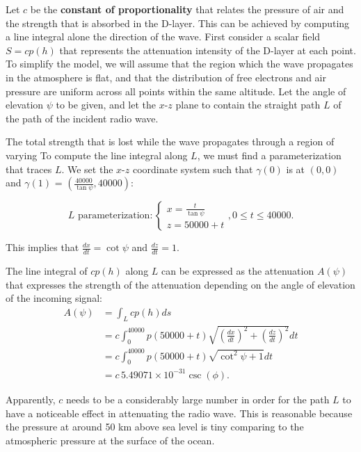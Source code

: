 \documentclass{article}
\begin{document}
Let $c$ be the \textbf{constant of proportionality} that relates the pressure of air and the strength that is absorbed in the D-layer. This can be achieved by computing a line integral alone the direction of the wave. First consider a scalar field $S = cp(h)$ that represents the attenuation intensity of the D-layer at each point. To simplify the model, we will assume that the region which the wave propagates in the atmosphere is flat, and that the distribution of free electrons and air pressure are uniform across all points within the same altitude. Let the angle of elevation $\psi$ to be given, and let the $x$-$z$ plane to contain the straight path $L$ of the path of the incident radio wave.

The total strength that is lost while the wave propagates through a region of varying To compute the line integral along $L$, we must find a parameterization that traces $L$. We set the $x$-$z$ coordinate system such that $\gamma(0)$ is at $(0,0)$ and $\gamma(1)$ = $\left(\frac{40000}{\tan \psi},40000\right)$:

\begin{equation}
L \text{ parameterization}:\begin{cases}
x = \frac{t}{\tan \psi} \\[10pt]
z = 50000+t
\end{cases}, 0 \le t \le 40000.
\end{equation}

This implies that $\displaystyle\frac{dx}{dt} = \cot\psi$ and $\displaystyle\frac{dz}{dt} = 1.$

The line integral of $cp(h)$ along $L$ can be expressed as the attenuation $A(\psi)$ that expresses the strength of the attenuation depending on the angle of elevation of the incoming signal: 
\begin{align}
    A \left(\psi\right) & = \int_L cp\left(h\right) ds\\
    & = c \int_0^{40000}p\left(50000 + t\right) \sqrt{\left(\frac{dx}{dt}\right)^2 + \left(\frac{dz}{dt}\right)^2}dt \\
    & = c \int_0^{40000} p\left(50000 + t\right) \sqrt{\cot^2 \psi + 1} dt \\
    & = c\, 5.49071\times 10^{-31} \csc(\phi).
\end{align}

Apparently, $c$ needs to be a considerably large number in order for the path $L$ to have a noticeable effect in attenuating the radio wave. This is reasonable because the pressure at around 50 km above sea level is tiny comparing to the atmospheric pressure at the surface of the ocean.
\end{document}
